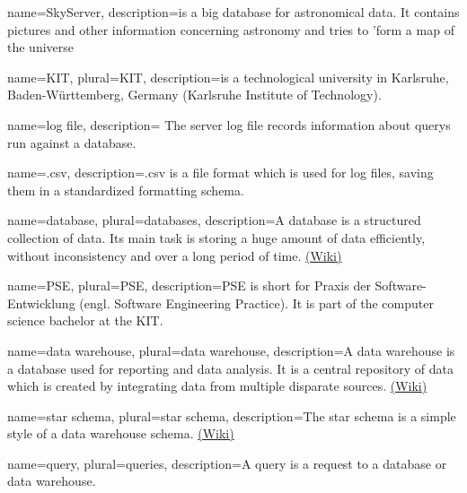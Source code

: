 {
  name=SkyServer,
  description={is a big database for astronomical data. It contains pictures
              and other information concerning astronomy and tries to 'form a 
              map of the universe
              }
}


{
  name=KIT,
  plural=KIT,
  description={is a technological university in Karlsruhe, Baden-Württemberg, Germany 
              (Karlsruhe Institute of Technology).}
}


{
  name=log file,
  description={
The server log file records information about \glspl{query} run against a  \gls{database}.}
}


{
  name=.csv,
  description={.csv is a file format which is used for log files, 
  saving them in a standardized formatting schema.}
}


{
  name=database,
  plural=databases,
  description={A database is a structured collection of data. Its main task is
  storing a huge amount of data efficiently, without inconsistency and over a long period of time.   
  \href{https://en.wikipedia.org/wiki/Database}{(Wiki)}}
}


{
  name=PSE,
  plural=PSE,
  description={PSE is short for Praxis der Software-Entwicklung (engl. Software Engineering Practice).
  It is part of the computer science bachelor at the \gls{KIT}.}
}


{
  name=data warehouse,
  plural=data warehouse,
  description={A data warehouse is a \gls{database} used for reporting and data analysis.
  It is a central repository of data which is created by integrating data from multiple disparate sources.
  \href{https://en.wikipedia.org/wiki/Data_warehouse}{(Wiki)}}
}
  
  
{
  name=star schema,
  plural=star schema,
  description={The star schema is a simple style of a \gls{data warehouse} schema.
 \href{https://en.wikipedia.org/wiki/Star_schema}{(Wiki)}}
}

  
{
  name=query,
  plural=queries,
  description={A query is a request to a \gls{database} or \gls{data warehouse}.}
}


